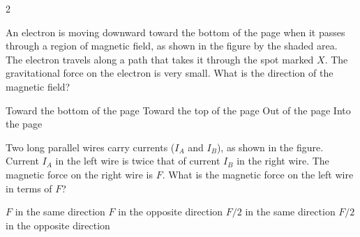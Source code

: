 \documentclass{../../../oss-apphys-exam}
\begin{document}
{}

\raggedcolumns


\begin{multicols*}{2}
  \begin{questions}
    \question An electron is moving downward toward the bottom of the page when
    it passes through a region of magnetic field, as shown in the figure by
    the shaded area. The electron travels along a path that takes it through
    the spot marked $X$. The gravitational force on the electron is very
    small. What is the direction of the magnetic field?
    \begin{center}
    \end{center}
    \begin{choices}
      \choice Toward the bottom of the page
      \choice Toward the top of the page
      \choice Out of the page
      \choice Into the page
    \end{choices}
    
    \question Two long parallel wires carry currents ($I_A$ and $I_B$), as shown
    in the figure. Current $I_A$ in the left wire is twice that of current
    $I_B$ in the right wire. The magnetic force on the right wire is $F$. What
    is the magnetic force on the left wire in terms of $F$?
    \begin{center}
    \end{center}
    \begin{choices}
      \choice $F$ in the same direction
      \choice $F$ in the opposite direction
      \choice $F/2$ in the same direction
      \choice $F/2$ in the opposite direction
    \end{choices}
    \columnbreak
    

\end{questions}
\end{multicols*}
\end{document}
